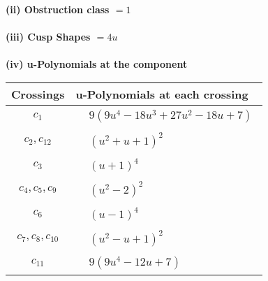 \documentclass[1p]{elsarticle_modified}
\theoremstyle{definition}
\begin{document}
\flushleft \textbf{(ii) Obstruction class $= 1$}\\~\\
\flushleft \textbf{(iii) Cusp Shapes $= 4 u$}\\~\\
\newpage\renewcommand{\arraystretch}{1}
\flushleft \textbf{(iv) u-Polynomials at the component}\newline \\
\begin{tabular}{m{50pt}|m{274pt}}
Crossings & \hspace{64pt}u-Polynomials at each crossing \\
\hline $$\begin{aligned}c_{1}\end{aligned}$$&$\begin{aligned}
&9(9 u^4-18 u^3+27 u^2-18 u+7)
\end{aligned}$\\
\hline $$\begin{aligned}c_{2},c_{12}\end{aligned}$$&$\begin{aligned}
&(u^2+u+1)^2
\end{aligned}$\\
\hline $$\begin{aligned}c_{3}\end{aligned}$$&$\begin{aligned}
&(u+1)^4
\end{aligned}$\\
\hline $$\begin{aligned}c_{4},c_{5},c_{9}\end{aligned}$$&$\begin{aligned}
&(u^2-2)^2
\end{aligned}$\\
\hline $$\begin{aligned}c_{6}\end{aligned}$$&$\begin{aligned}
&(u-1)^4
\end{aligned}$\\
\hline $$\begin{aligned}c_{7},c_{8},c_{10}\end{aligned}$$&$\begin{aligned}
&(u^2- u+1)^2
\end{aligned}$\\
\hline $$\begin{aligned}c_{11}\end{aligned}$$&$\begin{aligned}
&9(9 u^4-12 u+7)
\end{aligned}$\\
\hline
\end{tabular}\\~\\
\end{document}
